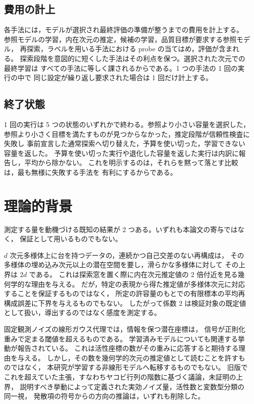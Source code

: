 \documentclass[11pt,a4paper]{jsarticle}
\begin{document}
\subsection{費用の計上}\label{sec:framework_cost}

各手法には，モデルが選択され最終評価の準備が整うまでの費用を計上する。
参照モデルの学習，内在次元の推定，候補の学習，品質目標が要求する参照モデル，
再探索，ラベルを用いる手法における probe の当てはめ，評価が含まれる。
探索段階を意図的に短くした手法はその利点を保つ。選択された次元での最終学習は
すべての手法に等しく課されるからである。1 つの手法の 1 回の実行の中で
同じ設定が繰り返し要求された場合は 1 回だけ計上する。

\subsection{終了状態}\label{sec:framework_outcomes}

1 回の実行は 5 つの状態のいずれかで終わる。参照より小さい容量を選択した，
参照より小さく目標を満たすものが見つからなかった，推定段階が信頼性検査に失敗し
事前宣言した通常探索へ切り替えた，予算を使い切った，学習できない容量を返した。
予算を使い切った実行や退化した容量を返した実行は内訳に報告し，平均から除かない。
これを明示するのは，それらを黙って落とす比較は，最も無様に失敗する手法を
有利にするからである。

\section{理論的背景}\label{sec:theory}

測定する量を動機づける既知の結果が 2 つある。いずれも本論文の寄与ではなく，
保証として用いるものでもない。

$d$ 次元多様体上に台を持つデータの，連続かつ自己交差のない再構成は，
その多様体の埋め込み次元以上の潜在空間を要し，滑らかな多様体に対して
その上界は $2d$ である\cite{hatcher2002algebraic}。
これは探索窓を置く際に内在次元推定値の 2 倍付近を見る幾何学的な理由を与える。
だが，特定の表現から得た推定値が多様体次元に対応することを保証するものではなく，
所定の許容量のもとでの有限標本の平均再構成誤差に下界を与えるものでもない。
したがって係数 2 は検証対象の既定値として扱い，導出するのではなく感度を測定する。

固定観測ノイズの線形ガウス代理では，情報を保つ潜在座標は，
信号が正則化重みで定まる閾値を超えるものである\cite{cover2006elements}。
学習済みモデルについても関連する挙動が報告されている\cite{rolinek2019pca}。
これは活性座標の数がその重みに応答すると期待する理由を与える。
しかし，その数を幾何学的次元の推定値として読むことを許すものではなく，
本研究が学習する非線形モデルへ転移するものでもない。
旧版でこれを超えていた主張，すなわちヤコビ行列の階数に基づく議論，未証明の上界，
説明すべき挙動によって定義された実効ノイズ量，活性数と変数型分類の同一視，
発散項の符号からの方向の推論は，いずれも削除した。
\end{document}
